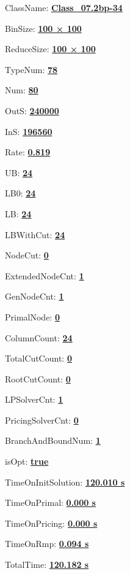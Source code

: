 \documentclass[11pt]{article}
\begin{document}
\pagestyle{empty}


ClassName: \underline{\textbf{Class_07.2bp-34}}
\par
BinSize: \underline{\textbf{100 × 100}}
\par
ReduceSize: \underline{\textbf{100 × 100}}
\par
TypeNum: \underline{\textbf{78}}
\par
Num: \underline{\textbf{80}}
\par
OutS: \underline{\textbf{240000}}
\par
InS: \underline{\textbf{196560}}
\par
Rate: \underline{\textbf{0.819}}
\par
UB: \underline{\textbf{24}}
\par
LB0: \underline{\textbf{24}}
\par
LB: \underline{\textbf{24}}
\par
LBWithCut: \underline{\textbf{24}}
\par
NodeCut: \underline{\textbf{0}}
\par
ExtendedNodeCnt: \underline{\textbf{1}}
\par
GenNodeCnt: \underline{\textbf{1}}
\par
PrimalNode: \underline{\textbf{0}}
\par
ColumnCount: \underline{\textbf{24}}
\par
TotalCutCount: \underline{\textbf{0}}
\par
RootCutCount: \underline{\textbf{0}}
\par
LPSolverCnt: \underline{\textbf{1}}
\par
PricingSolverCnt: \underline{\textbf{0}}
\par
BranchAndBoundNum: \underline{\textbf{1}}
\par
isOpt: \underline{\textbf{true}}
\par
TimeOnInitSolution: \underline{\textbf{120.010 s}}
\par
TimeOnPrimal: \underline{\textbf{0.000 s}}
\par
TimeOnPricing: \underline{\textbf{0.000 s}}
\par
TimeOnRmp: \underline{\textbf{0.094 s}}
\par
TotalTime: \underline{\textbf{120.182 s}}
\par
\newpage


\end{document}
